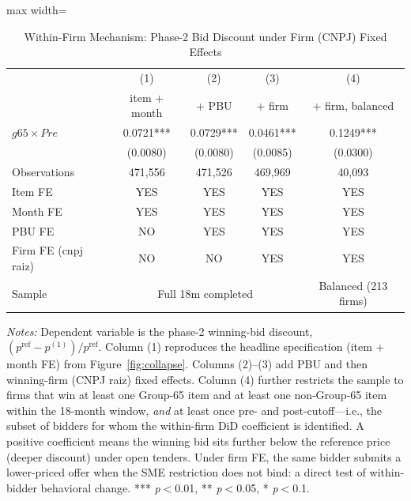 \begin{table}[htbp]
\centering
\caption{Within-Firm Mechanism: Phase-2 Bid Discount under Firm (CNPJ) Fixed Effects}
\label{tab:firm_fe}
\begin{adjustbox}{max width=\textwidth}
\begin{threeparttable}
\small
\begin{tabular}{lcccc}
\toprule
 & (1) & (2) & (3) & (4) \\
 & item + month & + PBU & + firm & + firm, balanced \\
\midrule
$g65 \times Pre$ & 0.0721*** & 0.0729*** & 0.0461*** & 0.1249*** \\
 & (0.0080) & (0.0080) & (0.0085) & (0.0300) \\
\midrule
Observations & 471,556 & 471,526 & 469,969 & 40,093 \\
Item FE & YES & YES & YES & YES \\
Month FE & YES & YES & YES & YES \\
PBU FE & NO & YES & YES & YES \\
Firm FE (cnpj raiz) & NO & NO & YES & YES \\
Sample & \multicolumn{3}{c}{Full 18m completed} & Balanced (213 firms) \\
\bottomrule
\end{tabular}
\begin{tablenotes}
\small
\item \textit{Notes:} Dependent variable is the phase-2 winning-bid
discount, $(p^\text{ref} - p^{(1)}) / p^\text{ref}$. Column (1) reproduces
the headline specification (item + month FE) from Figure~\ref{fig:collapse}.
Columns (2)--(3) add PBU and then winning-firm (CNPJ raiz) fixed
effects. Column (4) further restricts the sample to firms that win at
least one Group-65 item and at least one non-Group-65 item within the
18-month window, \emph{and} at least once pre- and post-cutoff---i.e., the
subset of bidders for whom the within-firm DiD coefficient is identified.
A positive coefficient means the winning bid sits further below the
reference price (deeper discount) under open tenders. Under firm FE, the
same bidder submits a lower-priced offer when the SME restriction does
not bind: a direct test of within-bidder behavioral change.
*** \textit{p}$<$0.01, ** \textit{p}$<$0.05, * \textit{p}$<$0.1.
\end{tablenotes}
\end{threeparttable}
\end{adjustbox}
\end{table}
